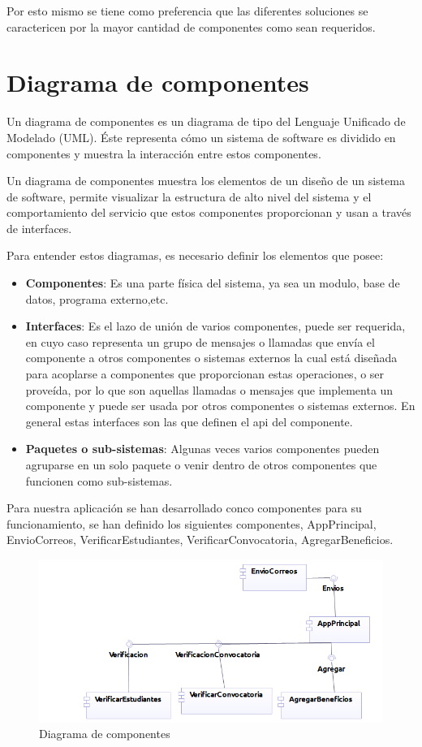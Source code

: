 Por esto mismo se tiene como preferencia que las diferentes soluciones se caractericen por la mayor cantidad de componentes como sean requeridos.

\section{Diagrama de componentes}

Un diagrama de componentes es un diagrama de tipo del Lenguaje Unificado de Modelado (UML). Éste representa cómo un sistema de software es dividido en componentes y muestra la interacción entre estos componentes.

Un diagrama de componentes muestra los elementos de un diseño de un sistema de software, permite visualizar la estructura de alto nivel del sistema y el comportamiento del servicio que estos componentes proporcionan y usan a través de interfaces\cite{Pw7DC}.

Para entender estos diagramas, es necesario definir los elementos que posee:
\begin{itemize}
	\item \textbf{Componentes}: Es una parte física del sistema, ya sea un modulo, base de datos, programa externo,etc. 
	\item \textbf{Interfaces}: Es el lazo de unión de varios componentes, puede ser requerida, en cuyo caso representa un grupo de mensajes o llamadas que envía el componente a otros componentes o sistemas externos la cual está diseñada para acoplarse a componentes que proporcionan estas operaciones, o ser proveída, por lo que son aquellas llamadas o mensajes que implementa un componente y puede ser usada por otros componentes o sistemas externos. En general estas interfaces son las que definen el api del componente.
	\item \textbf{Paquetes o sub-sistemas}: Algunas veces varios componentes pueden agruparse en un solo paquete o venir dentro de otros componentes que funcionen como sub-sistemas.
\end{itemize} 

Para nuestra aplicación se han desarrollado conco componentes para su funcionamiento, se han definido los siguientes componentes, AppPrincipal, EnvioCorreos, VerificarEstudiantes, VerificarConvocatoria, AgregarBeneficios.

\begin{figure}[H]
	\centering
	\includegraphics[width=1\linewidth]{parte2/imgs/DiagramaDeComponentes/componentes}
	\caption{Diagrama de componentes }
	\label{fig:api}
\end{figure}

